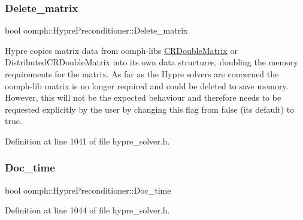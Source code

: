 \subsubsection{\texorpdfstring{Delete\+\_\+matrix}{Delete\_matrix}}
{\footnotesize\ttfamily bool oomph\+::\+Hypre\+Preconditioner\+::\+Delete\+\_\+matrix\hspace{0.3cm}{\ttfamily [private]}}



Hypre copies matrix data from oomph-\/lib\textquotesingle{}s \hyperlink{classoomph_1_1CRDoubleMatrix}{C\+R\+Double\+Matrix} or Distributed\+C\+R\+Double\+Matrix into its own data structures, doubling the memory requirements for the matrix. As far as the Hypre solvers are concerned the oomph-\/lib matrix is no longer required and could be deleted to save memory. However, this will not be the expected behaviour and therefore needs to be requested explicitly by the user by changing this flag from false (its default) to true. 



Definition at line 1041 of file hypre\+\_\+solver.\+h.

\mbox{\label{classoomph_1_1HyprePreconditioner_ac88a0ccc5367586dd10e7c7c1a1f6f70}} 
\subsubsection{\texorpdfstring{Doc\+\_\+time}{Doc\_time}}
{\footnotesize\ttfamily bool oomph\+::\+Hypre\+Preconditioner\+::\+Doc\+\_\+time\hspace{0.3cm}{\ttfamily [private]}}



Definition at line 1044 of file hypre\+\_\+solver.\+h.

\mbox{\label{classoomph_1_1HyprePreconditioner_a812e880bd4518b75c937870c2da0f7cd}} 
